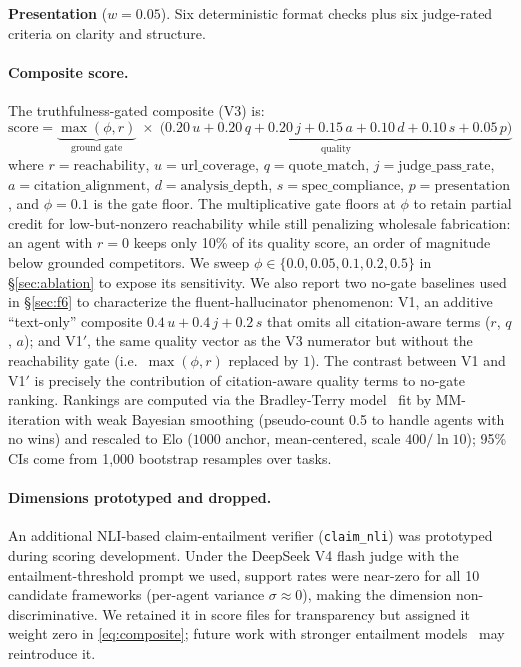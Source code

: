 \documentclass{article}
\begin{document}
\textbf{Presentation} ($w{=}0.05$). Six deterministic format checks plus six judge-rated criteria on clarity and structure.

\paragraph{Composite score.} The truthfulness-gated composite (\textsc{V3}) is:
\begin{equation}
\text{score} = \underbrace{\max(\phi, r)}_{\text{ground gate}} \;\times\; \underbrace{\bigl(0.20\,u + 0.20\,q + 0.20\,j + 0.15\,a + 0.10\,d + 0.10\,s + 0.05\,p\bigr)}_{\text{quality}}
\label{eq:composite}
\end{equation}
where $r{=}\text{reachability}$, $u{=}\text{url\_coverage}$, $q{=}\text{quote\_match}$, $j{=}\text{judge\_pass\_rate}$, $a{=}\text{citation\_alignment}$, $d{=}\text{analysis\_depth}$, $s{=}\text{spec\_compliance}$, $p{=}\text{presentation}$, and $\phi{=}0.1$ is the gate floor. The multiplicative gate floors at $\phi$ to retain partial credit for low-but-nonzero reachability while still penalizing wholesale fabrication: an agent with $r{=}0$ keeps only 10\% of its quality score, an order of magnitude below grounded competitors. We sweep $\phi \in \{0.0, 0.05, 0.1, 0.2, 0.5\}$ in \S\ref{sec:ablation} to expose its sensitivity. We also report two no-gate baselines used in \S\ref{sec:f6} to characterize the fluent-hallucinator phenomenon: \textsc{V1}, an additive ``text-only'' composite $0.4\,u + 0.4\,j + 0.2\,s$ that omits all citation-aware terms ($r$, $q$, $a$); and \textsc{V1$'$}, the same quality vector as the V3 numerator but without the reachability gate (i.e.\ $\max(\phi,r)$ replaced by $1$). The contrast between V1 and V1$'$ is precisely the contribution of citation-aware quality terms to no-gate ranking. Rankings are computed via the Bradley-Terry model~\citep{bradleyterry1952,chatbot_arena2024} fit by MM-iteration with weak Bayesian smoothing (pseudo-count 0.5 to handle agents with no wins) and rescaled to Elo ($1000$ anchor, mean-centered, scale $400/\ln 10$); 95\% CIs come from 1{,}000 bootstrap resamples over tasks.

\paragraph{Dimensions prototyped and dropped.} An additional NLI-based claim-entailment verifier (\texttt{claim\_nli}) was prototyped during scoring development. Under the DeepSeek V4 flash judge with the entailment-threshold prompt we used, support rates were near-zero for all 10 candidate frameworks (per-agent variance $\sigma \approx 0$), making the dimension non-discriminative. We retained it in score files for transparency but assigned it weight zero in \eqref{eq:composite}; future work with stronger entailment models~\citep{alce2023} may reintroduce it.
\end{document}
